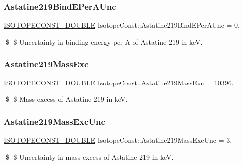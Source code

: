 \subsubsection{\texorpdfstring{Astatine219\+Bind\+E\+Per\+A\+Unc}{Astatine219BindEPerAUnc}}
{\footnotesize\ttfamily \mbox{\hyperlink{group___isotope_const-_macros_ga8f45a7272ce02c0b4c65c44636ed719a}{I\+S\+O\+T\+O\+P\+E\+C\+O\+N\+S\+T\+\_\+\+D\+O\+U\+B\+LE}} Isotope\+Const\+::\+Astatine219\+Bind\+E\+Per\+A\+Unc = 0.}

\$ \$ Uncertainty in binding energy per A of Astatine-\/219 in keV. \mbox{\label{group___isotope_const-_astatine-_at219_gabca1eb0d8b3d784d15675acd7782c9ed}} 
\subsubsection{\texorpdfstring{Astatine219\+Mass\+Exc}{Astatine219MassExc}}
{\footnotesize\ttfamily \mbox{\hyperlink{group___isotope_const-_macros_ga8f45a7272ce02c0b4c65c44636ed719a}{I\+S\+O\+T\+O\+P\+E\+C\+O\+N\+S\+T\+\_\+\+D\+O\+U\+B\+LE}} Isotope\+Const\+::\+Astatine219\+Mass\+Exc = 10396.}

\$ \$ Mass excess of Astatine-\/219 in keV. \mbox{\label{group___isotope_const-_astatine-_at219_ga29f9f1922627be06bdb29a69bc5d5a81}} 
\subsubsection{\texorpdfstring{Astatine219\+Mass\+Exc\+Unc}{Astatine219MassExcUnc}}
{\footnotesize\ttfamily \mbox{\hyperlink{group___isotope_const-_macros_ga8f45a7272ce02c0b4c65c44636ed719a}{I\+S\+O\+T\+O\+P\+E\+C\+O\+N\+S\+T\+\_\+\+D\+O\+U\+B\+LE}} Isotope\+Const\+::\+Astatine219\+Mass\+Exc\+Unc = 3.}

\$ \$ Uncertainty in mass excess of Astatine-\/219 in keV. \mbox{\label{group___isotope_const-_astatine-_at219_ga38b213a3812e82b984062d93e6b8de84}} 
